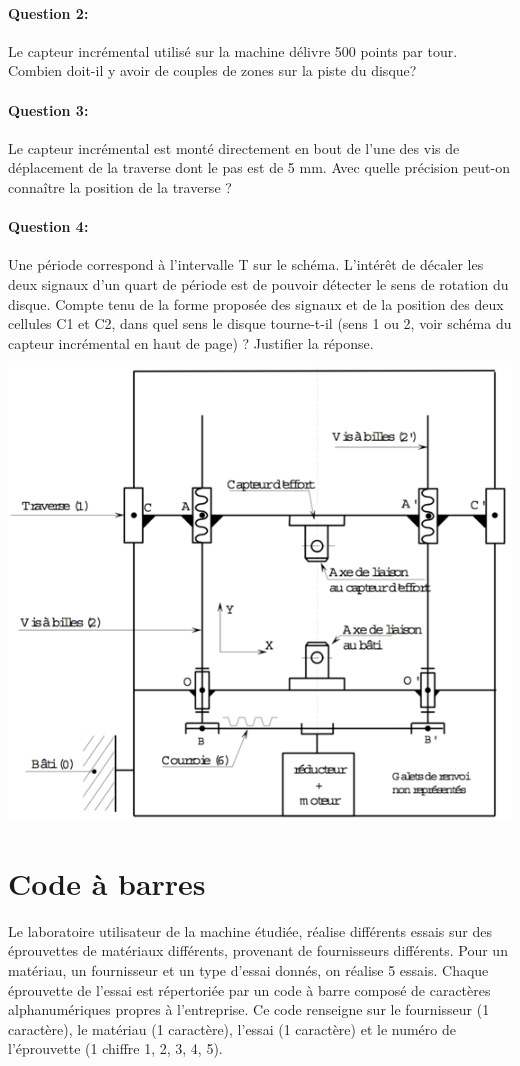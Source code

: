 \paragraph{Question 2:} Le capteur incrémental utilisé sur la machine délivre 500 points par tour. Combien doit-il y avoir de couples de zones sur la piste du disque?

\paragraph{Question 3:} Le capteur incrémental est monté directement en bout de l'une des vis de déplacement de la traverse dont le pas est de 5 mm. Avec quelle précision peut-on connaître la position de la traverse ?

\paragraph{Question 4:} Une période correspond à l'intervalle T sur le schéma. L'intérêt de décaler les deux signaux d'un quart de période est de pouvoir détecter le sens de rotation du disque. Compte tenu de la forme proposée des signaux et de la position des deux cellules C1 et C2, dans quel sens le disque tourne-t-il (sens 1 ou 2, voir schéma du capteur incrémental en haut de page) ? Justifier la réponse. 

\begin{center}
 \includegraphics[width=0.6\linewidth]{img/figure05}
\end{center}

\section{Code à barres}

Le laboratoire utilisateur de la machine étudiée, réalise différents essais sur des éprouvettes de matériaux différents, provenant de fournisseurs différents. Pour un matériau, un fournisseur et un type d'essai donnés, on réalise 5 essais. Chaque éprouvette de l'essai est répertoriée par un code à barre composé de caractères alphanumériques propres à l'entreprise. Ce code renseigne sur le fournisseur (1 caractère), le matériau (1 caractère), l'essai (1 caractère) et le numéro de l'éprouvette (1 chiffre {1, 2, 3, 4, 5}).

